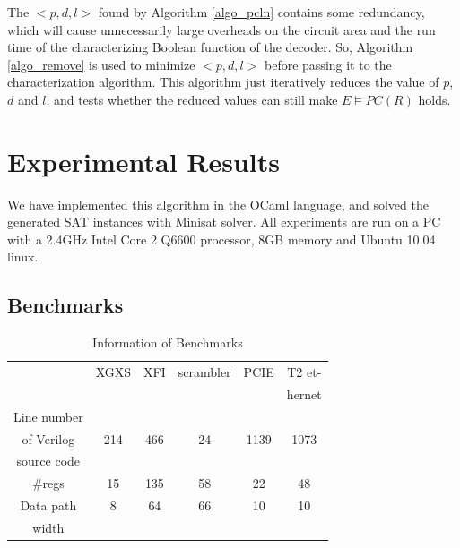 \documentclass{acm_proc_article-sp}
\begin{document}
The $<p,d,l>$ found by Algorithm \ref{algo_pcln} contains some redundancy,
which will cause unnecessarily large overheads on the circuit area and the run time of the characterizing Boolean function of the decoder.
So,
Algorithm \ref{algo_remove} is used to minimize $<p,d,l>$ before passing it to the characterization algorithm.
This algorithm just iteratively reduces the value of $p$, $d$ and $l$,
and tests whether the reduced values can still make $E\vDash PC(R)$ holds.



\section{Experimental Results}\label{sec_exp}
We have implemented this algorithm in the OCaml language,
and solved the generated SAT instances with Minisat solver\cite{EXTSAT}.
All experiments are run on a PC with a 2.4GHz Intel Core 2 Q6600 processor, 8GB memory and Ubuntu 10.04 linux.
\subsection{Benchmarks}

\begin{table}[b]
\centering
\caption{Information of Benchmarks}
\begin{tabular}{|c|c|c|c|c|c|}
\hline
&XGXS&XFI&scrambler&PCIE&T2 et-\\
&&&&&hernet\\\hline
Line number&&&&&\\
of Verilog&214&466&24&1139&1073\\
source code&&&&&\\\hline
\#regs&15&135&58&22&48\\\hline
Data path&8&64&66&10&10\\
width&&&&&\\ \hline
\end{tabular}\label{tab_benchmark}
\end{table}
\end{document}
